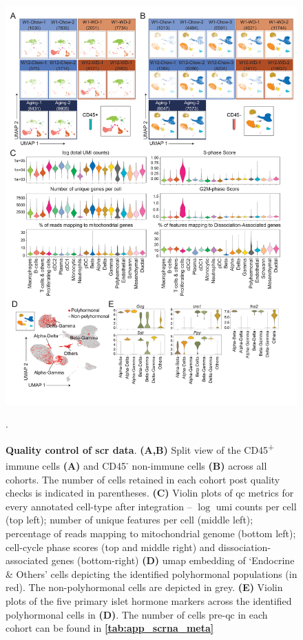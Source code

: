 \begin{figure}[H]
    \centering
    \includegraphics[width=13cm]{Appendix2/Fig/F2-A5-01.png}
    \caption[Quality control of  data]{\textbf{Quality control of \gls{scr} data}. 
    \textbf{(A,B)} Split view of the CD45\textsuperscript{+} immune cells \textbf{(A)} and CD45\textsuperscript{-} non-immune cells \textbf{(B)} across all cohorts. The number of cells retained in each cohort post quality checks is indicated in parentheses. \textbf{(C)} Violin plots of \gls{qc} metrics for every annotated cell-type after integration –  $\log$ \gls{umi} counts per cell (top left); number of unique features per cell (middle left); percentage of reads mapping to mitochondrial genome (bottom left); cell-cycle phase scores (top and middle right) and dissociation-associated genes (bottom-right) \textbf{(D)} \gls{umap} embedding of `Endocrine \& Others' cells depicting the identified polyhormonal populations (in red). The non-polyhormonal cells are depicted in grey. \textbf{(E)} Violin plots of the five primary islet hormone markers across the identified polyhormonal cells in \textbf{(D)}. The number of cells pre-\gls{qc} in each cohort can be found in \textbf{\autoref{tab:app_scrna_meta}}}.
    \label{fig:app_scrna_qc}
\end{figure}

